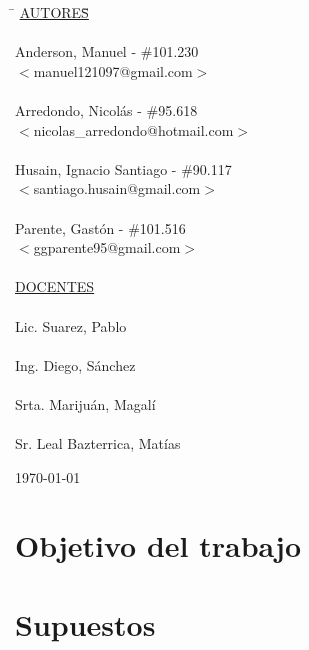 \begin{titlepage}
	\begin{tabbing}
		\hspace{2cm}\=\+
		\underline{AUTORES}\hspace{-1cm}\=\+\hspace{1cm}\=\hspace{6cm}\=\\
		\\
		Anderson, Manuel			\>\>- \#101.230\\
		\>\footnotesize{$<$manuel121097@gmail.com$>$}\\
		\\
		Arredondo, Nicolás			\>\>- \#95.618\\
		\>\footnotesize{$<$nicolas\_arredondo@hotmail.com$>$}\\
		\\
		Husain, Ignacio Santiago	\>\>- \#90.117\\
		\>\footnotesize{$<$santiago.husain@gmail.com$>$}\\
		\\
		Parente, Gastón			 	\>\>- \#101.516 \\
		\>\footnotesize{$<$ggparente95@gmail.com$>$}\\
		\\
		\<\underline{DOCENTES}\\
		\\
		Lic. Suarez, Pablo \\
		\\
		Ing. Diego, Sánchez \\
		\\
		Srta. Marijuán, Magalí\\
		\\
		Sr. Leal Bazterrica, Matías
	\end{tabbing}


	\today

\end{titlepage}

\clearpage
\tableofcontents
\clearpage
\section{Objetivo del trabajo}

\section{Supuestos}

